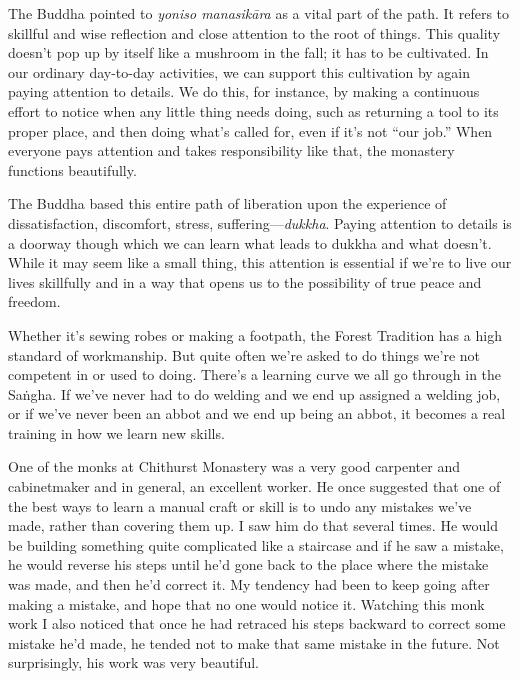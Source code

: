 The Buddha pointed to \emph{yoniso manasikāra} as a vital part of the 
path. It refers to skillful and wise reflection and close attention to 
the root of things. This quality doesn't pop up by itself like a 
mushroom in the fall; it has to be cultivated. In our ordinary 
day-to-day activities, we can support this cultivation by again paying 
attention to details. We do this, for instance, by making a continuous 
effort to notice when any little thing needs doing, such as returning a 
tool to its proper place, and then doing what's called for, even if 
it's not ``our job.'' When everyone pays attention and takes 
responsibility like that, the monastery functions beautifully.

The Buddha based this entire path of liberation upon the experience of 
dissatisfaction, discomfort, stress, suffering---\emph{dukkha}. Paying 
attention to details is a doorway though which we can learn what leads 
to dukkha and what doesn't. While it may seem like a small thing, this 
attention is essential if we're to live our lives skillfully and in a 
way that opens us to the possibility of true peace and freedom.


Whether it's sewing robes or making a footpath, the Forest Tradition 
has a high standard of workmanship. But quite often we're asked to do 
things we're not competent in or used to doing. There's a learning 
curve we all go through in the Saṅgha. If we've never had to do 
welding and we end up assigned a welding job, or if we've never been an 
abbot and we end up being an abbot, it becomes a real training in how 
we learn new skills.

One of the monks at Chithurst Monastery was a very good carpenter and 
cabinetmaker and in general, an excellent worker. He once suggested 
that one of the best ways to learn a manual craft or skill is to undo 
any mistakes we've made, rather than covering them up. I saw him do 
that several times. He would be building something quite complicated 
like a staircase and if he saw a mistake, he would reverse his steps 
until he'd gone back to the place where the mistake was made, and then 
he'd correct it. My tendency had been to keep going after making a 
mistake, and hope that no one would notice it. Watching this monk work 
I also noticed that once he had retraced his steps backward to correct 
some mistake he'd made, he tended not to make that same mistake in the 
future. Not surprisingly, his work was very beautiful.

